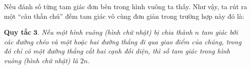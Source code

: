 	\begin{multicols}{2}
		Nếu đánh số từng tam giác đơn bên trong hình vuông ta thấy.
		\vskip 0.1cm
		Như vậy, ta rút ra một “câu thần chú” đếm tam giác vô cùng đơn giản trong trường hợp này đó là:
		\begin{figure}[H]
			\centering
			\vspace*{-5pt}
			\captionsetup{labelformat= empty, justification=centering}
			\captionsetup[subfigure]{labelformat=empty}
			\hfill{}
			\hfill
			\hfill
			\vspace*{-10pt}
		\end{figure} 
	\end{multicols}
	\vskip 0.1cm
	\textbf{\color{toancuabi}Quy tắc} $\pmb{3.}$ \textit{Nếu một hình vuông (hình chữ nhật) bị chia thành $n$ tam giác bởi các đường chéo và một hoặc hai đường thẳng đi qua giao điểm của chúng, trong đó chỉ có một đường thẳng cắt hai cạnh đối diện, thì số tam giác trong hình vuông (hình chữ nhật) là $2n$.}
	\vskip 0.1cm
